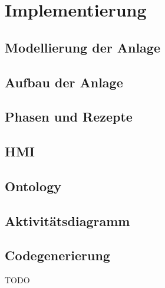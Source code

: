 \chapter{Implementierung} \label{chapter:thevetestcase}
\section{Modellierung der Anlage}
\section{Aufbau der Anlage}
\section{Phasen und Rezepte}
\section{HMI}
\section{Ontology}
\section{Aktivitätsdiagramm}
\section{Codegenerierung}

TODO
